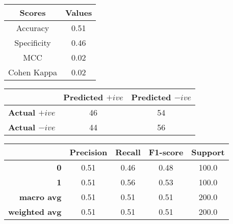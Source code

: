 \documentclass{article}
\begin{document}
\begin{table}[h]
  \centering
  \begin{tabular}{|c|c|}
    \hline
    \textbf{Scores} & \textbf{Values} \\
    \hline
    Accuracy & 0.51 \\
    \hline
    Specificity & 0.46 \\
    \hline
    MCC & 0.02 \\
    \hline
    Cohen Kappa & 0.02 \\
    \hline
  \end{tabular}
\end{table}

\begin{table}[h]
  \centering
  \begin{tabular}{|c|c|c|}
    \hline
     & \textbf{Predicted $+ive$} & \textbf{Predicted $-ive$} \\
    \hline
    \textbf{Actual $+ive$} & 46 & 54 \\
    \hline
    \textbf{Actual $-ive$} & 44 & 56 \\
    \hline
  \end{tabular}
\end{table}

\begin{table}[h]
  \centering
  \begin{tabular}{|r|c|c|c|c|}
    \hline
    & \textbf{Precision} & \textbf{Recall} & \textbf{F1-score} & \textbf{Support} \\
    \hline

    \textbf{0} & 0.51 & 0.46 & 0.48 & 100.0 \\
    \hline
    \textbf{1} & 0.51 & 0.56 & 0.53 & 100.0 \\
    \hline
    \textbf{macro avg} & 0.51 & 0.51 & 0.51 & 200.0 \\
    \hline
    \textbf{weighted avg} & 0.51 & 0.51 & 0.51 & 200.0 \\
    \hline
  \end{tabular}
\end{table}
\end{document}
